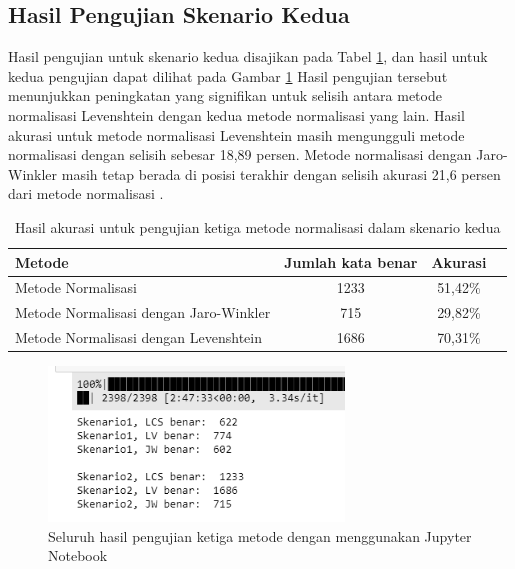 \subsection{Hasil Pengujian Skenario Kedua}

Hasil pengujian untuk skenario kedua disajikan pada Tabel \ref{tbl:result_2}, dan hasil untuk kedua pengujian dapat dilihat pada Gambar \ref{fig:ss_pengujian} Hasil pengujian tersebut menunjukkan peningkatan yang signifikan untuk selisih antara metode normalisasi Levenshtein dengan kedua metode normalisasi yang lain. Hasil akurasi untuk metode normalisasi Levenshtein masih mengungguli metode normalisasi \parencite{saragih2017normalisasi} dengan selisih sebesar 18,89 persen. Metode normalisasi dengan Jaro-Winkler masih tetap berada di posisi terakhir dengan selisih akurasi 21,6 persen dari metode normalisasi \parencite{saragih2017normalisasi}.
\begin{table}[ht]
    \captionsetup{justification=justified,singlelinecheck=false}
    \caption{Hasil akurasi untuk pengujian ketiga metode normalisasi dalam skenario kedua}
    \label{tbl:result_2}
    \centering
    \begin{tabularx}{\textwidth}{|X|c|c|c|}
        \hline
        \multicolumn{1}{|Y|}{\textbf{Metode}} & \textbf{Jumlah kata benar} & \textbf{Akurasi} \\ \hline
        Metode Normalisasi \parencite{saragih2017normalisasi} & 1233 & 51,42\% \\ \hline
        Metode Normalisasi dengan Jaro-Winkler & 715 & 29,82\% \\ \hline
        Metode Normalisasi dengan Levenshtein & 1686 & 70,31\% \\ \hline
    \end{tabularx}
\end{table}
\begin{figure}[ht]
	\centering
	\includegraphics[width=0.7\textwidth, trim=2 2 2 2, clip]{resources/4/ss_pengujian.png}
	\caption{Seluruh hasil pengujian ketiga metode dengan menggunakan Jupyter Notebook}
	\label{fig:ss_pengujian}
\end{figure}


